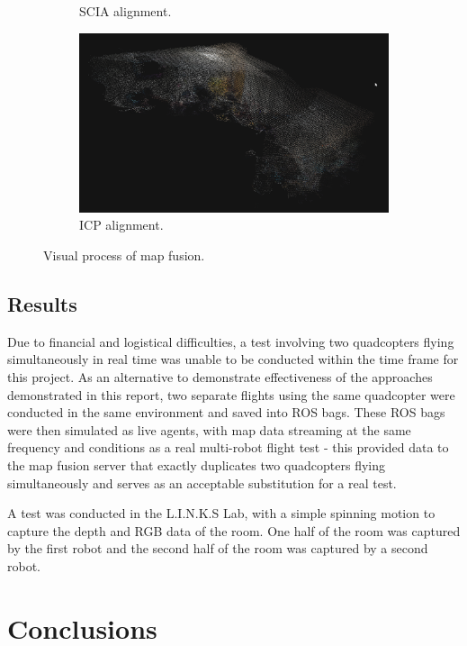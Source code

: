\documentclass[letterpaper, oneside, 10pt]{report}
\begin{document}
\begin{figure}[h]
\begin{subfigure}[h]{0.31\textwidth}
        \caption{SCIA alignment.}
        \label{fig:SCIA alignment.}
    \end{subfigure}
    \hfill
    \begin{subfigure}[h]{0.31\textwidth}
        \centering
        \includegraphics[width=\textwidth]{images/fusion_scia}
        \caption{ICP alignment.}
        \label{fig:ICP alignment.}
    \end{subfigure}
    \caption{Visual process of map fusion.}
    \label{fig:Visual process of map fusion.}
\end{figure}

\section{Results}

Due to financial and logistical difficulties, a test involving two quadcopters flying simultaneously in real time was unable to be conducted within the time frame for this project. As an alternative to demonstrate effectiveness of the approaches demonstrated in this report, two separate flights using the same quadcopter were conducted in the same environment and saved into ROS bags. These ROS bags were then simulated as live agents, with map data streaming at the same frequency and conditions as a real multi-robot flight test - this provided data to the map fusion server that exactly duplicates two quadcopters flying simultaneously and serves as an acceptable substitution for a real test.

A test was conducted in the L.I.N.K.S Lab, with a simple spinning motion to capture the depth and RGB data of the room. One half of the room was captured by the first robot and the second half of the room was captured by a second robot.

\chapter{Conclusions}
\end{document}
